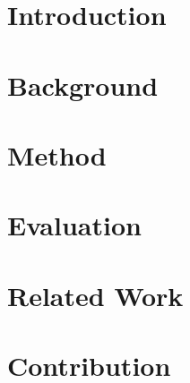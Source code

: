 \documentclass[manuscript,review,screen,nonacm,sigplan]{acmart}
\begin{document}
\begin{CCSXML}
\end{CCSXML}




\maketitle

\section{Introduction}
\section{Background}
\section{Method}
\section{Evaluation}
\section{Related Work}
\section{Contribution}
\end{document}
